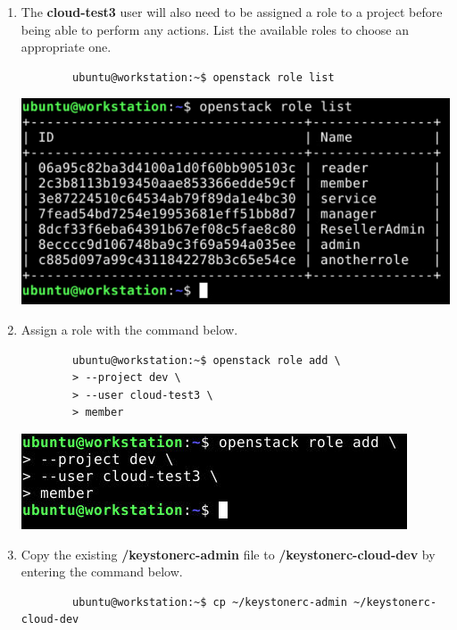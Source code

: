 \documentclass[letterpaper, 12pt]{article}
\begin{document}
\begin{enumerate}
    \item The \textbf{cloud-test3} user will also need to be assigned a role to a project before being able to perform
    any actions. List the available roles to choose an appropriate one.
    \begin{lstlisting}
        ubuntu@workstation:~$ openstack role list
    \end{lstlisting}

    \begin{center}
        \includegraphics[width=\linewidth]{images/part4/step6.png}
    \end{center}

    \item  Assign a role with the command below.
    \begin{lstlisting}
        ubuntu@workstation:~$ openstack role add \
        > --project dev \
        > --user cloud-test3 \
        > member
    \end{lstlisting}

    \begin{center}
        \includegraphics[width=\linewidth]{images/part4/step7.png}
    \end{center}

    \item Copy the existing \textbf{\texttildemid/keystonerc-admin} file to \textbf{\texttildemid/keystonerc-cloud-dev}
    by entering the command below.
    \label{it:copy_keystone}
    \begin{lstlisting}
        ubuntu@workstation:~$ cp ~/keystonerc-admin ~/keystonerc-cloud-dev
    \end{lstlisting}


\end{enumerate}
\end{document}
